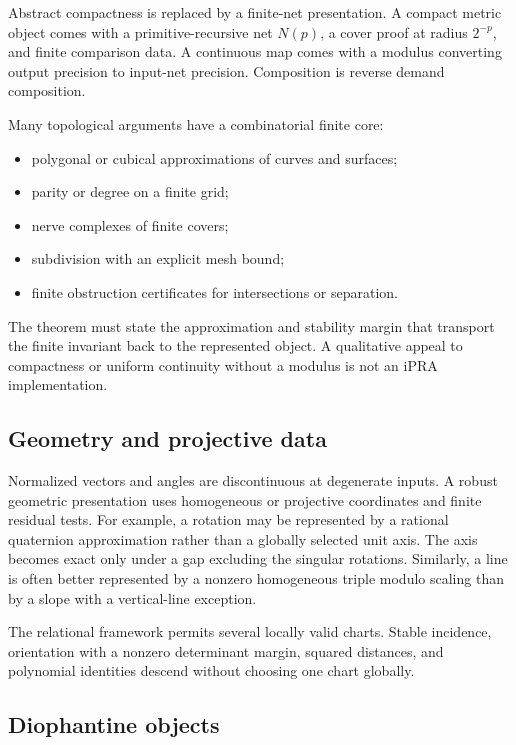 Abstract compactness is replaced by a finite-net presentation.  A compact metric object comes with a primitive-recursive net $N(p)$, a cover proof at radius $2^{-p}$, and finite comparison data.  A continuous map comes with a modulus converting output precision to input-net precision.  Composition is reverse demand composition.

Many topological arguments have a combinatorial finite core:

\begin{itemize}
  \item polygonal or cubical approximations of curves and surfaces;
  \item parity or degree on a finite grid;
  \item nerve complexes of finite covers;
  \item subdivision with an explicit mesh bound;
  \item finite obstruction certificates for intersections or separation.
\end{itemize}

The theorem must state the approximation and stability margin that transport the finite invariant back to the represented object.  A qualitative appeal to compactness or uniform continuity without a modulus is not an iPRA implementation.

\subsection{Geometry and projective data}

Normalized vectors and angles are discontinuous at degenerate inputs.  A robust geometric presentation uses homogeneous or projective coordinates and finite residual tests.  For example, a rotation may be represented by a rational quaternion approximation rather than a globally selected unit axis.  The axis becomes exact only under a gap excluding the singular rotations.  Similarly, a line is often better represented by a nonzero homogeneous triple modulo scaling than by a slope with a vertical-line exception.

The relational framework permits several locally valid charts.  Stable incidence, orientation with a nonzero determinant margin, squared distances, and polynomial identities descend without choosing one chart globally.

\subsection{Diophantine objects}

